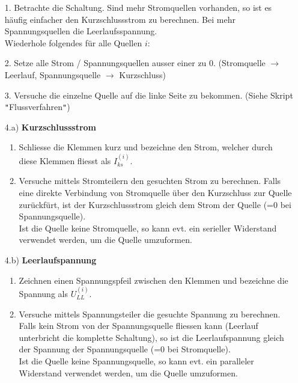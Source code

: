 										\newpage
										\beginvor
										\begin{itemize}

										  \item[1.] Betrachte die Schaltung. Sind mehr Stromquellen vorhanden, so ist es häufig einfacher den Kurzschlussstrom zu berechnen. Bei mehr Spannungsquellen die Leerlaufsspannung. \\
										  Wiederhole folgendes für alle Quellen $i$: \\
										  \end{itemize}
										  \beginip
										  \begin{itemize}

										  \item [2.  ]  Setze alle Strom / Spannungsquellen ausser einer zu 0. (Stromquelle $\rightarrow$ Leerlauf, Spannungsquelle $\rightarrow$ Kurzschluss)
										  \item[3. ] Versuche die einzelne Quelle auf die linke Seite zu bekommen. (Siehe Skript \texttt{"}Flussverfahren\texttt{"})
										  \item[4.a)] \textbf{Kurzschlussstrom}
										  \begin{enumerate}
										  \item Schliesse die Klemmen kurz und bezeichne den Strom, welcher durch diese Klemmen fliesst als $I_{ks}^{(i)}$.
										  \item Versuche mittels Stromteilern den gesuchten Strom zu berechnen. Falls eine direkte Verbindung von Stromquelle über den Kurzschluss zur Quelle zurückfürt, ist der Kurzschlussstrom gleich dem Strom der Quelle (=0 bei Spannungsquelle). \\
										  Ist die Quelle keine Stromquelle, so kann evt. ein serieller Widerstand verwendet werden, um die Quelle umzuformen.
										  \end{enumerate}
										  \item[4.b)] \textbf{Leerlaufspannung}
										  \begin{enumerate}
										  \item Zeichnen einen Spannungspfeil zwischen den Klemmen und bezeichne die Spannung als $U_{LL}^{(i)}$.
										  \item Versuche mittels Spannungsteiler die gesuchte Spannung zu berechnen. Falls kein Strom von der Spannungsquelle fliessen kann (Leerlauf unterbricht die komplette Schaltung), so ist die Leerlaufspannung gleich der Spannung der Spannungsquelle (=0 bei Stromquelle). \\
										  Ist die Quelle keine Spannungsquelle, so kann evt. ein paralleler Widerstand verwendet werden, um die Quelle umzuformen.
										  \end{enumerate}
										\end{itemize}

